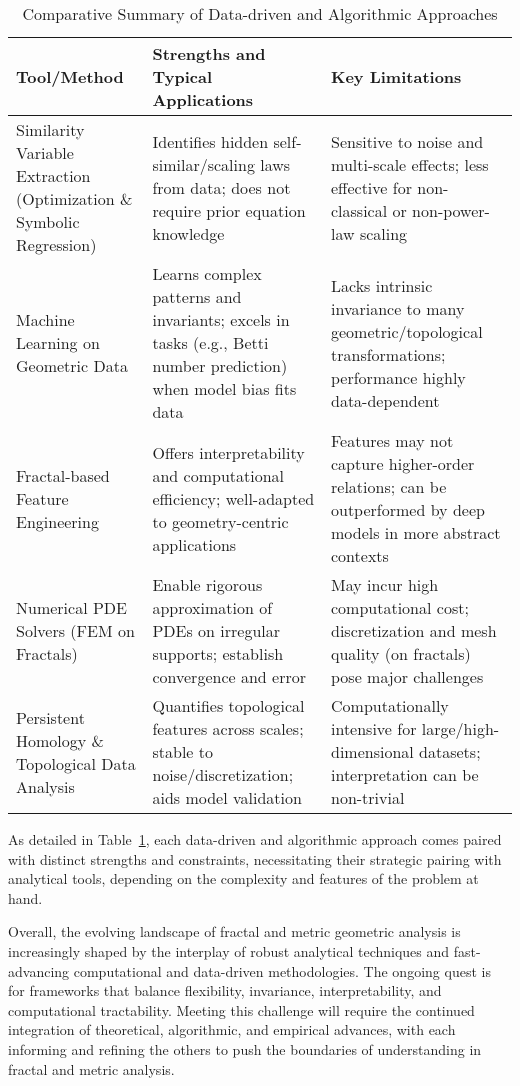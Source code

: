 \documentclass[11pt]{article}
\begin{document}
\begin{table}[h]
\centering
\caption{Comparative Summary of Data-driven and Algorithmic Approaches}
\label{tab:data_driven_methods}
\begin{tabular}{|l|p{4.9cm}|p{5.2cm}|}
\hline
\textbf{Tool/Method} & \textbf{Strengths and Typical Applications} & \textbf{Key Limitations} \\
\hline
Similarity Variable Extraction (Optimization \& Symbolic Regression) & Identifies hidden self-similar/scaling laws from data; does not require prior equation knowledge & Sensitive to noise and multi-scale effects; less effective for non-classical or non-power-law scaling \\
\hline
Machine Learning on Geometric Data & Learns complex patterns and invariants; excels in tasks (e.g., Betti number prediction) when model bias fits data & Lacks intrinsic invariance to many geometric/topological transformations; performance highly data-dependent \\
\hline
Fractal-based Feature Engineering & Offers interpretability and computational efficiency; well-adapted to geometry-centric applications & Features may not capture higher-order relations; can be outperformed by deep models in more abstract contexts \\
\hline
Numerical PDE Solvers (FEM on Fractals) & Enable rigorous approximation of PDEs on irregular supports; establish convergence and error & May incur high computational cost; discretization and mesh quality (on fractals) pose major challenges \\
\hline
Persistent Homology \& Topological Data Analysis & Quantifies topological features across scales; stable to noise/discretization; aids model validation & Computationally intensive for large/high-dimensional datasets; interpretation can be non-trivial \\
\hline
\end{tabular}
\end{table}

As detailed in Table~\ref{tab:data_driven_methods}, each data-driven and algorithmic approach comes paired with distinct strengths and constraints, necessitating their strategic pairing with analytical tools, depending on the complexity and features of the problem at hand.

Overall, the evolving landscape of fractal and metric geometric analysis is increasingly shaped by the interplay of robust analytical techniques and fast-advancing computational and data-driven methodologies. The ongoing quest is for frameworks that balance flexibility, invariance, interpretability, and computational tractability. Meeting this challenge will require the continued integration of theoretical, algorithmic, and empirical advances, with each informing and refining the others to push the boundaries of understanding in fractal and metric analysis.
\end{document}
